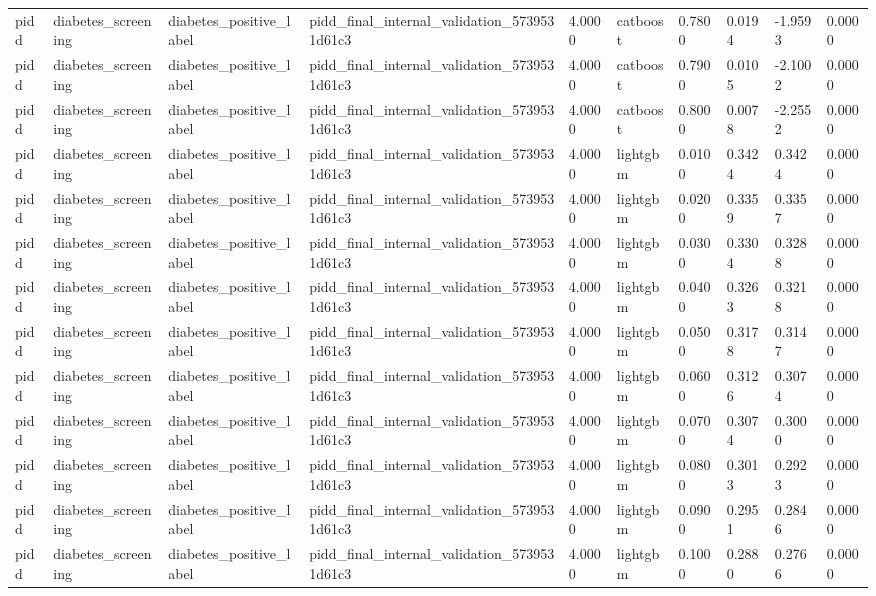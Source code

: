 \begin{tabular}{llllllllll}
pidd & diabetes\_screening & diabetes\_positive\_label & pidd\_final\_internal\_validation\_5739531d61c3 & 4.0000 & catboost & 0.7800 & 0.0194 & -1.9593 & 0.0000 \\
pidd & diabetes\_screening & diabetes\_positive\_label & pidd\_final\_internal\_validation\_5739531d61c3 & 4.0000 & catboost & 0.7900 & 0.0105 & -2.1002 & 0.0000 \\
pidd & diabetes\_screening & diabetes\_positive\_label & pidd\_final\_internal\_validation\_5739531d61c3 & 4.0000 & catboost & 0.8000 & 0.0078 & -2.2552 & 0.0000 \\
pidd & diabetes\_screening & diabetes\_positive\_label & pidd\_final\_internal\_validation\_5739531d61c3 & 4.0000 & lightgbm & 0.0100 & 0.3424 & 0.3424 & 0.0000 \\
pidd & diabetes\_screening & diabetes\_positive\_label & pidd\_final\_internal\_validation\_5739531d61c3 & 4.0000 & lightgbm & 0.0200 & 0.3359 & 0.3357 & 0.0000 \\
pidd & diabetes\_screening & diabetes\_positive\_label & pidd\_final\_internal\_validation\_5739531d61c3 & 4.0000 & lightgbm & 0.0300 & 0.3304 & 0.3288 & 0.0000 \\
pidd & diabetes\_screening & diabetes\_positive\_label & pidd\_final\_internal\_validation\_5739531d61c3 & 4.0000 & lightgbm & 0.0400 & 0.3263 & 0.3218 & 0.0000 \\
pidd & diabetes\_screening & diabetes\_positive\_label & pidd\_final\_internal\_validation\_5739531d61c3 & 4.0000 & lightgbm & 0.0500 & 0.3178 & 0.3147 & 0.0000 \\
pidd & diabetes\_screening & diabetes\_positive\_label & pidd\_final\_internal\_validation\_5739531d61c3 & 4.0000 & lightgbm & 0.0600 & 0.3126 & 0.3074 & 0.0000 \\
pidd & diabetes\_screening & diabetes\_positive\_label & pidd\_final\_internal\_validation\_5739531d61c3 & 4.0000 & lightgbm & 0.0700 & 0.3074 & 0.3000 & 0.0000 \\
pidd & diabetes\_screening & diabetes\_positive\_label & pidd\_final\_internal\_validation\_5739531d61c3 & 4.0000 & lightgbm & 0.0800 & 0.3013 & 0.2923 & 0.0000 \\
pidd & diabetes\_screening & diabetes\_positive\_label & pidd\_final\_internal\_validation\_5739531d61c3 & 4.0000 & lightgbm & 0.0900 & 0.2951 & 0.2846 & 0.0000 \\
pidd & diabetes\_screening & diabetes\_positive\_label & pidd\_final\_internal\_validation\_5739531d61c3 & 4.0000 & lightgbm & 0.1000 & 0.2880 & 0.2766 & 0.0000 \\

\end{tabular}
